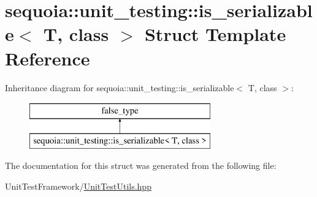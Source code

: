\hypertarget{structsequoia_1_1unit__testing_1_1is__serializable}{}\section{sequoia\+::unit\+\_\+testing\+::is\+\_\+serializable$<$ T, class $>$ Struct Template Reference}
\label{structsequoia_1_1unit__testing_1_1is__serializable}
Inheritance diagram for sequoia\+::unit\+\_\+testing\+::is\+\_\+serializable$<$ T, class $>$\+:\begin{figure}[H]
\begin{center}
\leavevmode
\includegraphics[height=2.000000cm]{structsequoia_1_1unit__testing_1_1is__serializable}
\end{center}
\end{figure}


The documentation for this struct was generated from the following file\+:\begin{DoxyCompactItemize}
\item 
Unit\+Test\+Framework/\mbox{\hyperlink{_unit_test_utils_8hpp}{Unit\+Test\+Utils.\+hpp}}\end{DoxyCompactItemize}
